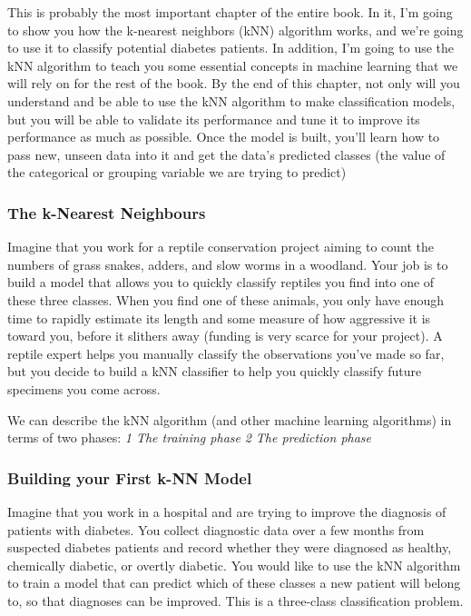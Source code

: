 \documentclass[
]{article}
\begin{document}
This is probably the most important chapter of the entire book. In it,
I'm going to show you how the k-nearest neighbors (kNN) algorithm works,
and we're going to use it to classify potential diabetes patients. In
addition, I'm going to use the kNN algorithm to teach you some essential
concepts in machine learning that we will rely on for the rest of the
book. By the end of this chapter, not only will you understand and be
able to use the kNN algorithm to make classification models, but you
will be able to validate its performance and tune it to improve its
performance as much as possible. Once the model is built, you'll learn
how to pass new, unseen data into it and get the data's predicted
classes (the value of the categorical or grouping variable we are trying
to predict)

\subsubsection{The k-Nearest Neighbours}\label{the-k-nearest-neighbours}

Imagine that you work for a reptile conservation project aiming to count
the numbers of grass snakes, adders, and slow worms in a woodland. Your
job is to build a model that allows you to quickly classify reptiles you
find into one of these three classes. When you find one of these
animals, you only have enough time to rapidly estimate its length and
some measure of how aggressive it is toward you, before it slithers away
(funding is very scarce for your project). A reptile expert helps you
manually classify the observations you've made so far, but you decide to
build a kNN classifier to help you quickly classify future specimens you
come across.

We can describe the kNN algorithm (and other machine learning
algorithms) in terms of two phases: \emph{1 The training phase} \emph{2
The prediction phase}

\subsubsection{Building your First k-NN
Model}\label{building-your-first-k-nn-model}

Imagine that you work in a hospital and are trying to improve the
diagnosis of patients with diabetes. You collect diagnostic data over a
few months from suspected diabetes patients and record whether they were
diagnosed as healthy, chemically diabetic, or overtly diabetic. You
would like to use the kNN algorithm to train a model that can predict
which of these classes a new patient will belong to, so that diagnoses
can be improved. This is a three-class classification problem.
\end{document}
